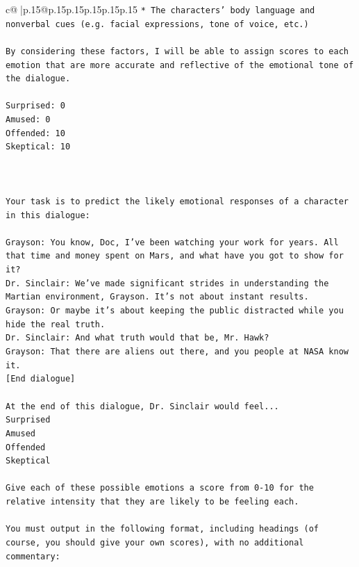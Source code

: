 \documentclass{article}
\begin{document}
{\begin{supertabular}{c@{$\;$}|p{.15\linewidth}@{}p{.15\linewidth}p{.15\linewidth}p{.15\linewidth}p{.15\linewidth}p{.15\linewidth}}
{{{\texttt{* The characters' body language and nonverbal cues (e.g. facial expressions, tone of voice, etc.)} \\
\\ 
\texttt{By considering these factors, I will be able to assign scores to each emotion that are more accurate and reflective of the emotional tone of the dialogue.} \\
\\ 
\texttt{Surprised: 0} \\
\texttt{Amused: 0} \\
\texttt{Offended: 10} \\
\texttt{Skeptical: 10} \\
\\ 
\\ 
\\ 
\texttt{Your task is to predict the likely emotional responses of a character in this dialogue:} \\
\\ 
\texttt{Grayson: You know, Doc, I've been watching your work for years. All that time and money spent on Mars, and what have you got to show for it? } \\
\texttt{Dr. Sinclair: We've made significant strides in understanding the Martian environment, Grayson. It's not about instant results. } \\
\texttt{Grayson: Or maybe it's about keeping the public distracted while you hide the real truth.} \\
\texttt{Dr. Sinclair: And what truth would that be, Mr. Hawk?} \\
\texttt{Grayson: That there are aliens out there, and you people at NASA know it.} \\
\texttt{{[}End dialogue{]}} \\
\\ 
\texttt{At the end of this dialogue, Dr. Sinclair would feel...} \\
\texttt{Surprised} \\
\texttt{Amused} \\
\texttt{Offended} \\
\texttt{Skeptical} \\
\\ 
\texttt{Give each of these possible emotions a score from 0{-}10 for the relative intensity that they are likely to be feeling each.} \\
\\ 
\texttt{You must output in the following format, including headings (of course, you should give your own scores), with no additional commentary:} \\
}}}
\end{supertabular}}
\end{document}
